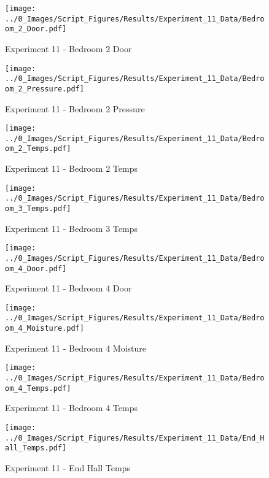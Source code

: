 	\begin{figure}[H]
		\centering
		\texttt{[image: ../0\_Images/Script\_Figures/Results/Experiment\_11\_Data/Bedroom\_2\_Door.pdf]}
		\caption[]{Experiment 11 - Bedroom 2 Door}
	\end{figure}
 
	\clearpage

	\begin{figure}[H]
		\centering
		\texttt{[image: ../0\_Images/Script\_Figures/Results/Experiment\_11\_Data/Bedroom\_2\_Pressure.pdf]}
		\caption[]{Experiment 11 - Bedroom 2 Pressure}
	\end{figure}
 

	\begin{figure}[H]
		\centering
		\texttt{[image: ../0\_Images/Script\_Figures/Results/Experiment\_11\_Data/Bedroom\_2\_Temps.pdf]}
		\caption[]{Experiment 11 - Bedroom 2 Temps}
	\end{figure}
 
	\clearpage

	\begin{figure}[H]
		\centering
		\texttt{[image: ../0\_Images/Script\_Figures/Results/Experiment\_11\_Data/Bedroom\_3\_Temps.pdf]}
		\caption[]{Experiment 11 - Bedroom 3 Temps}
	\end{figure}
 

	\begin{figure}[H]
		\centering
		\texttt{[image: ../0\_Images/Script\_Figures/Results/Experiment\_11\_Data/Bedroom\_4\_Door.pdf]}
		\caption[]{Experiment 11 - Bedroom 4 Door}
	\end{figure}
 
	\clearpage

	\begin{figure}[H]
		\centering
		\texttt{[image: ../0\_Images/Script\_Figures/Results/Experiment\_11\_Data/Bedroom\_4\_Moisture.pdf]}
		\caption[]{Experiment 11 - Bedroom 4 Moisture}
	\end{figure}
 

	\begin{figure}[H]
		\centering
		\texttt{[image: ../0\_Images/Script\_Figures/Results/Experiment\_11\_Data/Bedroom\_4\_Temps.pdf]}
		\caption[]{Experiment 11 - Bedroom 4 Temps}
	\end{figure}
 
	\clearpage

	\begin{figure}[H]
		\centering
		\texttt{[image: ../0\_Images/Script\_Figures/Results/Experiment\_11\_Data/End\_Hall\_Temps.pdf]}
		\caption[]{Experiment 11 - End Hall Temps}
	\end{figure}
 

